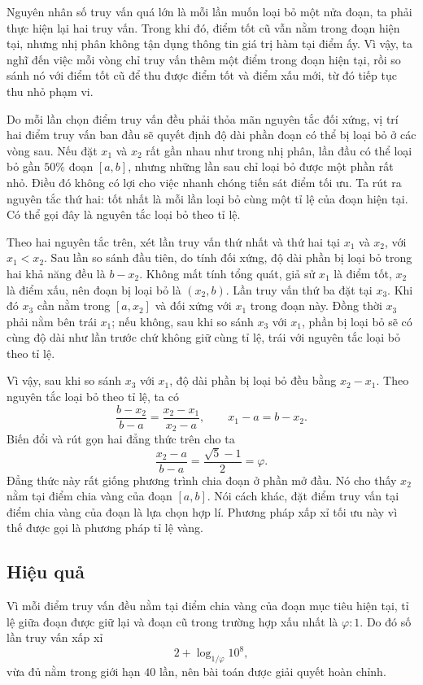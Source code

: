 \documentclass[11pt]{article}
\begin{document}
Nguyên nhân số truy vấn quá lớn là mỗi lần muốn loại bỏ một nửa đoạn, ta phải
thực hiện lại hai truy vấn. Trong khi đó, điểm tốt cũ vẫn nằm trong đoạn hiện
tại, nhưng nhị phân không tận dụng thông tin giá trị hàm tại điểm ấy. Vì vậy,
ta nghĩ đến việc mỗi vòng chỉ truy vấn thêm một điểm trong đoạn hiện tại, rồi
so sánh nó với điểm tốt cũ để thu được điểm tốt và điểm xấu mới, từ đó tiếp
tục thu nhỏ phạm vi.

Do mỗi lần chọn điểm truy vấn đều phải thỏa mãn nguyên tắc đối xứng, vị trí
hai điểm truy vấn ban đầu sẽ quyết định độ dài phần đoạn có thể bị loại bỏ ở
các vòng sau. Nếu đặt \(x_1\) và \(x_2\) rất gần nhau như trong nhị phân, lần
đầu có thể loại bỏ gần \(50\%\) đoạn \([a,b]\), nhưng những lần sau chỉ loại
bỏ được một phần rất nhỏ. Điều đó không có lợi cho việc nhanh chóng tiến sát
điểm tối ưu. Ta rút ra nguyên tắc thứ hai: tốt nhất là mỗi lần loại bỏ cùng
một tỉ lệ của đoạn hiện tại. Có thể gọi đây là nguyên tắc loại bỏ theo tỉ lệ.

Theo hai nguyên tắc trên, xét lần truy vấn thứ nhất và thứ hai tại \(x_1\) và
\(x_2\), với \(x_1<x_2\). Sau lần so sánh đầu tiên, do tính đối xứng, độ dài
phần bị loại bỏ trong hai khả năng đều là \(b-x_2\). Không mất tính tổng quát,
giả sử \(x_1\) là điểm tốt, \(x_2\) là điểm xấu, nên đoạn bị loại bỏ là
\((x_2,b)\). Lần truy vấn thứ ba đặt tại \(x_3\). Khi đó \(x_3\) cần nằm trong
\([a,x_2]\) và đối xứng với \(x_1\) trong đoạn này. Đồng thời \(x_3\) phải
nằm bên trái \(x_1\); nếu không, sau khi so sánh \(x_3\) với \(x_1\), phần bị
loại bỏ sẽ có cùng độ dài như lần trước chứ không giữ cùng tỉ lệ, trái với
nguyên tắc loại bỏ theo tỉ lệ.

Vì vậy, sau khi so sánh \(x_3\) với \(x_1\), độ dài phần bị loại bỏ đều bằng
\(x_2-x_1\). Theo nguyên tắc loại bỏ theo tỉ lệ, ta có
\[
  \frac{b-x_2}{b-a}
  =
  \frac{x_2-x_1}{x_2-a},
  \qquad
  x_1-a=b-x_2.
\]
Biến đổi và rút gọn hai đẳng thức trên cho ta
\[
  \frac{x_2-a}{b-a}
  =
  \frac{\sqrt{5}-1}{2}
  =\varphi.
\]
Đẳng thức này rất giống phương trình chia đoạn ở phần mở đầu. Nó cho thấy
\(x_2\) nằm tại điểm chia vàng của đoạn \([a,b]\). Nói cách khác, đặt điểm
truy vấn tại điểm chia vàng của đoạn là lựa chọn hợp lí. Phương pháp xấp xỉ
tối ưu này vì thế được gọi là phương pháp tỉ lệ vàng.

\subsection{Hiệu quả}

Vì mỗi điểm truy vấn đều nằm tại điểm chia vàng của đoạn mục tiêu hiện tại,
tỉ lệ giữa đoạn được giữ lại và đoạn cũ trong trường hợp xấu nhất là
\(\varphi:1\). Do đó số lần truy vấn xấp xỉ
\[
  2+\log_{1/\varphi} 10^8,
\]
vừa đủ nằm trong giới hạn \(40\) lần, nên bài toán được giải quyết hoàn chỉnh.
\end{document}
